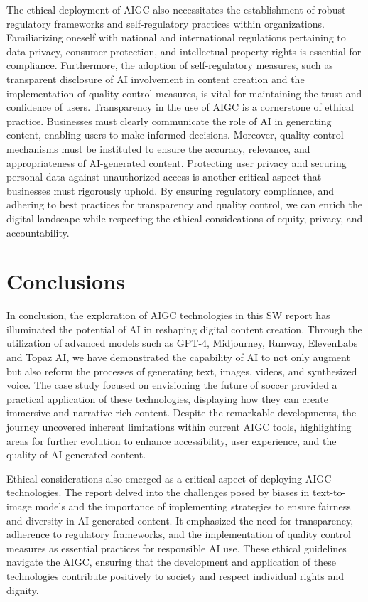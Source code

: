 \documentclass[11pt,a4paper,oneside]{report}
\begin{document}
The ethical deployment of AIGC also necessitates the establishment of robust regulatory frameworks and self-regulatory practices within organizations. 
Familiarizing oneself with national and international regulations pertaining to data privacy, consumer protection, and intellectual property rights is essential for compliance. 
Furthermore, the adoption of self-regulatory measures, such as transparent disclosure of AI involvement in content creation \cite{diakopoulos2016accountability} and the implementation of quality control measures, is vital for maintaining the trust and confidence of users.
Transparency in the use of AIGC is a cornerstone of ethical practice. 
Businesses must clearly communicate the role of AI in generating content, enabling users to make informed decisions. 
Moreover, quality control mechanisms must be instituted to ensure the accuracy, relevance, and appropriateness of AI-generated content. 
Protecting user privacy and securing personal data against unauthorized access is another critical aspect that businesses must rigorously uphold.
By ensuring regulatory compliance, and adhering to best practices for transparency and quality control, we can enrich the digital landscape while respecting the ethical consideations of equity, privacy, and accountability.


\chapter{Conclusions}
\label{conclusions}

In conclusion, the exploration of AIGC technologies in this SW report has illuminated the potential of AI in reshaping digital content creation. 
Through the utilization of advanced models such as GPT-4, Midjourney, Runway, ElevenLabs and Topaz AI, we have demonstrated the capability of AI to not only augment but also reform the processes of generating text, images, videos, and synthesized voice. 
The case study focused on envisioning the future of soccer provided a practical application of these technologies, displaying how they can create immersive and narrative-rich content. 
Despite the remarkable developments, the journey uncovered inherent limitations within current AIGC tools, highlighting areas for further evolution to enhance accessibility, user experience, and the quality of AI-generated content.

Ethical considerations also emerged as a critical aspect of deploying AIGC technologies. 
The report delved into the challenges posed by biases in text-to-image models and the importance of implementing strategies to ensure fairness and diversity in AI-generated content. 
It emphasized the need for transparency, adherence to regulatory frameworks, and the implementation of quality control measures as essential practices for responsible AI use. 
These ethical guidelines navigate the AIGC, ensuring that the development and application of these technologies contribute positively to society and respect individual rights and dignity.
\end{document}
